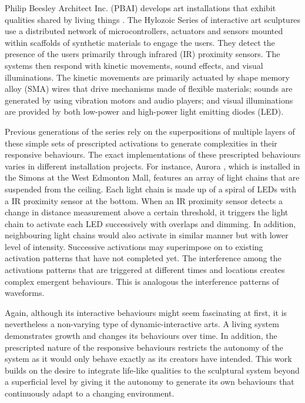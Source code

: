 Philip Beesley Architect Inc. (PBAI) develops art installations that exhibit qualities shared by living things \cite{Gorbet2015}. The Hylozoic Series of interactive art sculptures use a distributed network of microcontrollers, actuators and sensors mounted within scaffolds of synthetic materials to engage the users. They detect the presence of the users primarily through infrared (IR) proximity sensors. The systems then respond with kinetic movements, sound effects, and visual illuminations. The kinetic movements are primarily actuated by shape memory alloy (SMA) wires that drive mechanisms made of flexible materials; sounds are generated by using vibration motors and audio players; and visual illuminations are provided by both low-power and high-power light emitting diodes (LED). 

Previous generations of the series \cite{Beesley2012} rely on the superpositions of multiple layers of these simple sets of prescripted activations to generate complexities in their responsive behaviours. The exact implementations of these prescripted behaviours varies in different installation projects. For instance, Aurora \cite{PBAI-Simon}, which is installed in the Simons at the West Edmonton Mall, features an array of light chains that are suspended from the ceiling. Each light chain is made up of a spiral of LEDs with a IR proximity sensor at the bottom. When an IR proximity sensor detects a change in distance measurement above a certain threshold, it triggers the light chain to activate each LED successively with overlaps and dimming. In addition, neighbouring light chains would also activate in similar manner but with lower level of intensity. Successive activations may superimpose on to existing activation patterns that have not completed yet. The interference among the activations patterns that are triggered at different times and locations creates complex emergent behaviours. This is analogous the interference patterns of waveforms. 

Again, although its interactive behaviours might seem fascinating at first, it is nevertheless a non-varying type of dynamic-interactive arts. A living system demonstrates growth and changes its behaviours over time. In addition, the prescripted nature of the responsive behaviours restricts the autonomy of the system as it would only behave exactly as its creators have intended. This work builds on the desire to integrate life-like qualities to the sculptural system beyond a superficial level by giving it the autonomy to generate its own behaviours that continuously adapt to a changing environment.

